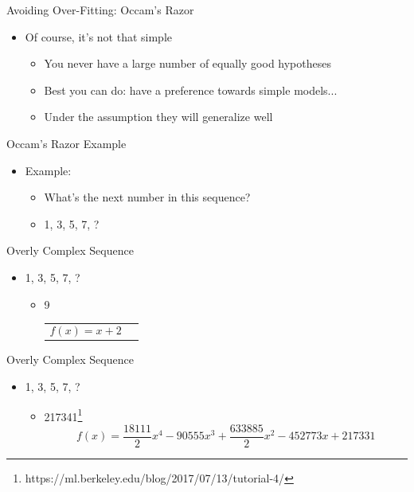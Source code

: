 \documentclass[aspectratio=169]{beamer}
\begin{document}
\begin{frame}{Avoiding Over-Fitting: Occam's Razor}

\begin{itemize}
\item Of course, it's not that simple
	\begin{itemize}
	\item You never have a large number of equally good hypotheses
	\item Best you can do: have a preference towards simple models...
	\item Under the assumption they will generalize well
	\end{itemize}
\end{itemize}
\end{frame}



\begin{frame}{Occam's Razor Example}

\begin{itemize}
\item Example:
	\begin{itemize}
	\item What's the next number in this sequence?
	\item 1, 3, 5, 7, ?
	\end{itemize}

\end{itemize}
\end{frame}


\begin{frame}{Overly Complex Sequence}

\begin{itemize}
	\item 1, 3, 5, 7, ?
	\begin{itemize}
	\item 9\\
\begin{tabular}{lr}
	$$ f(x) = x + 2$$
\end{tabular}
\end{itemize}
\end{itemize}
\end{frame}
\begin{frame}{Overly Complex Sequence}

\begin{itemize}
	\item 1, 3, 5, 7, ?
	\begin{itemize}
	\item 217341\footnote{https://ml.berkeley.edu/blog/2017/07/13/tutorial-4/}\\
$$f(x) = \frac{18111}{2} x^4 - 90555x^3 + \frac{633885}{2}x^2 - 452773x + 217331 $$
	\end{itemize}
\end{itemize}
\end{frame}
\end{document}
